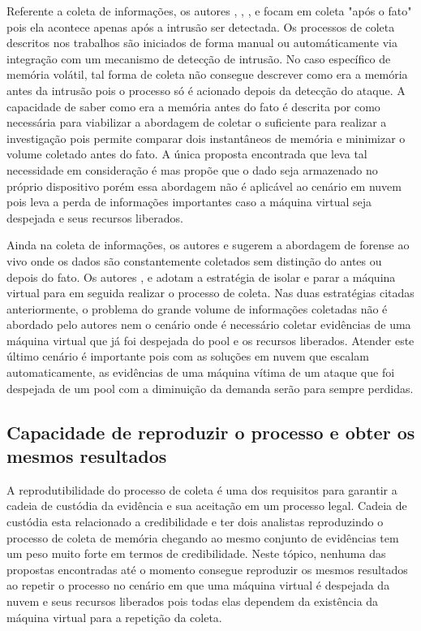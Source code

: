 \documentclass[conference]{IEEEtran}
\begin{document}
Referente a coleta de informações, os autores \cite{Reichert_Auto_acquisition:2015}, \cite{Poisel_VMI:2013}, \cite{Dykstra_FROST:2013}, \cite{George_DF2CE:2012} e \cite{Sang_Log_approach:2013} focam em coleta "após o fato" pois ela acontece apenas após a intrusão ser detectada. 
%
Os processos de coleta descritos nos trabalhos são iniciados de forma manual ou automáticamente via integração com um mecanismo de detecção de intrusão. 
%
No caso específico de memória volátil, tal forma de coleta não consegue descrever como era a memória antes da intrusão pois o processo só é acionado depois da detecção do ataque. 
%
A capacidade de saber como era a memória antes do fato é descrita por \cite{Case_Memory_Forensics:2014} como necessária para viabilizar a abordagem de coletar o suficiente para realizar a investigação pois permite comparar dois instantâneos de memória e minimizar o volume coletado antes do fato. 
%
A única proposta encontrada que leva tal necessidade em consideração é \cite{Dezfouli_Backup_approach:2012} mas propõe que o dado seja armazenado no próprio dispositivo porém essa abordagem não é aplicável ao cenário em nuvem pois leva a perda de informações importantes caso a máquina virtual seja despejada e seus recursos liberados.

Ainda na coleta de informações, os autores \cite{Reichert_Auto_acquisition:2015} e \cite{George_DF2CE:2012} sugerem a abordagem de forense ao vivo onde os dados são constantemente coletados sem distinção do antes ou depois do fato. 
%
Os autores \cite{Poisel_VMI:2013}, \cite{Dykstra_FROST:2013} e \cite{Sang_Log_approach:2013} adotam a estratégia de isolar e parar a máquina virtual para em seguida realizar o processo de coleta. 
%
Nas duas estratégias citadas anteriormente, o problema do grande volume de informações coletadas não é abordado pelo autores nem o cenário onde é necessário coletar evidências de uma máquina virtual que já foi despejada do pool e os recursos liberados. 
%
Atender este último cenário é importante pois com as soluções em nuvem que escalam automaticamente, as evidências de uma máquina vítima de um ataque que foi despejada de um pool com a diminuição da demanda serão para sempre perdidas. 

\subsection{Capacidade de reproduzir o processo e obter os mesmos resultados}

A reprodutibilidade do processo de coleta é uma dos requisitos para garantir a cadeia de custódia da evidência e sua aceitação em um processo legal. Cadeia de custódia esta relacionado a credibilidade e ter dois analistas reproduzindo o processo de coleta de memória chegando ao mesmo conjunto de evidências tem um peso muito forte em termos de credibilidade. 
%
Neste tópico, nenhuma das propostas encontradas até o momento consegue reproduzir os mesmos resultados ao repetir o processo no cenário em que uma máquina virtual é despejada da nuvem e seus recursos liberados pois todas elas dependem da existência da máquina virtual para a repetição da coleta. 
\end{document}

